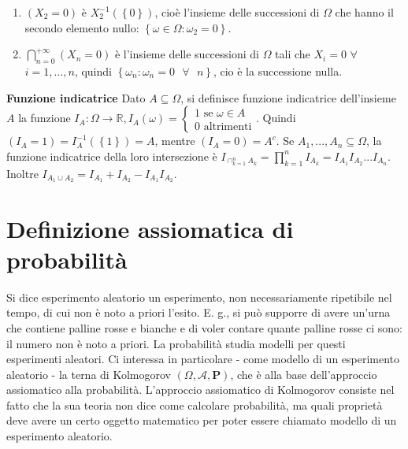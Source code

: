 \documentclass{article}
\begin{document}
\begin{enumerate}
\item $\left( X_{2}=0\right) $ \`{e} $X_{2}^{-1}\left( \left\{ 0\right\}
\right) $, cio\`{e} l'insieme delle successioni di $\Omega $ che hanno il
secondo elemento nullo: $\left\{ \omega \in \Omega :\omega _{2}=0\right\} $.

\item $\bigcap_{n=0}^{+\infty }\left( X_{n}=0\right) $ \`{e} l'insieme delle
successioni di $\Omega $ tali che $X_{i}=0$ $\forall $ $i=1,...,n$, quindi $%
\left\{ \omega _{n}:\omega _{n}=0\text{ }\forall \text{ }n\right\} $, cio%
\`{e} la successione nulla.
\end{enumerate}

\textbf{Funzione indicatrice} Dato $A\subseteq \Omega $, si definisce
funzione indicatrice dell'insieme $A$ la funzione $I_{A}:\Omega \rightarrow 
\mathbb{R}
,I_{A}\left( \omega \right) =\left\{ 
\begin{array}{c}
1\text{ se }\omega \in A \\ 
0\text{ altrimenti}%
\end{array}%
\right. $. Quindi $\left( I_{A}=1\right) =I_{A}^{-1}\left( \left\{ 1\right\}
\right) =A$, mentre $\left( I_{A}=0\right) =A^{c}$. Se $A_{1},...,A_{n}%
\subseteq \Omega $, la funzione indicatrice della loro intersezione \`{e} $%
I_{\cap
_{k=1}^{n}A_{k}}=\prod_{k=1}^{n}I_{A_{k}}=I_{A_{1}}I_{A_{2}}...I_{A_{n}}$.
Inoltre $I_{A_{1}\cup A_{2}}=I_{A_{1}}+I_{A_{2}}-I_{A_{1}}I_{A_{2}}$.

\section{Definizione assiomatica di probabilit\`{a}}

Si dice esperimento aleatorio un esperimento, non necessariamente ripetibile
nel tempo, di cui non \`{e} noto a priori l'esito. E. g., si pu\`{o}
supporre di avere un'urna che contiene palline rosse e bianche e di voler
contare quante palline rosse ci sono: il numero non \`{e} noto a priori. La
probabilit\`{a} studia modelli per questi esperimenti aleatori. Ci interessa
in particolare - come modello di un esperimento aleatorio - la terna di
Kolmogorov $\left( \Omega ,\mathcal{A},\mathbf{P}\right) $, che \`{e} alla
base dell'approccio assiomatico alla probabilit\`{a}. L'approccio
assiomatico di Kolmogorov consiste nel fatto che la sua teoria non dice come
calcolare probabilit\`{a}, ma quali propriet\`{a} deve avere un certo
oggetto matematico per poter essere chiamato modello di un esperimento
aleatorio.
\end{document}
